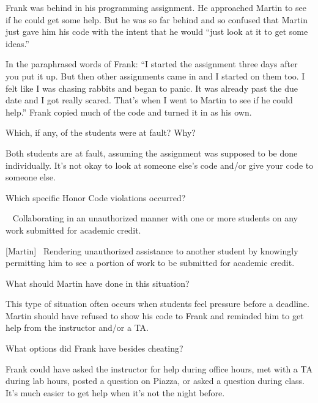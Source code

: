 
Frank was behind in his programming assignment.
He approached Martin to see if he could get some help.
But he was so far behind and so confused that Martin just gave him his code with the intent that he would ``just look at it to get some ideas.''

\vspace{1em}

In the paraphrased words of Frank: ``I started the assignment three days after you put it up.
But then other assignments came in and I started on them too.
I felt like I was chasing rabbits and began to panic.
It was already past the due date and I got really scared.
That's when I went to Martin to see if he could help.''
Frank copied much of the code and turned it in as his own.




\Q Which, if any, of the students were at fault? Why?

\begin{answer}[6em]
Both students are at fault, assuming the assignment was supposed to be done individually.
It's not okay to look at someone else's code and/or give your code to someone else.
\end{answer}


\Q Which specific Honor Code violations occurred?

\begin{answer}[8em]
[Frank]~ Collaborating in an unauthorized manner with one or more students on any work submitted for academic credit.

\bigskip

[Martin]~ Rendering unauthorized assistance to another student by knowingly permitting him to see a portion of work to be submitted for academic credit.
\end{answer}


\Q What should Martin have done in this situation?

\begin{answer}[6em]
This type of situation often occurs when students feel pressure before a deadline.
Martin should have refused to show his code to Frank and reminded him to get help from the instructor and/or a TA.
\end{answer}


\Q What options did Frank have besides cheating?

\begin{answer}[6em]
Frank could have asked the instructor for help during office hours, met with a TA during lab hours, posted a question on Piazza, or asked a question during class.
It's much easier to get help when it's not the night before.
\end{answer}
